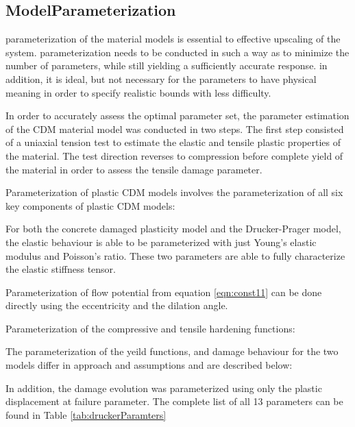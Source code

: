 \subsection{ModelParameterization}
parameterization of the material models is essential to effective upscaling of the system. parameterization needs to be conducted in such a way as to minimize the number of parameters, while still yielding a sufficiently accurate response. in addition, it is ideal, but not necessary for the parameters to have physical meaning in order to specify realistic bounds with less difficulty.

In order to accurately assess the optimal parameter set, the parameter estimation of the CDM material model was conducted in two steps. The first step consisted of a uniaxial tension test to estimate the elastic and tensile plastic properties of the material. The test direction reverses to compression before complete yield of the material in order to assess the tensile damage parameter. 

Parameterization of plastic CDM models involves the parameterization of all six key components of plastic CDM models:

For both the concrete damaged plasticity model and the Drucker-Prager model, the elastic behaviour is able to be parameterized with just Young's elastic modulus and Poisson's ratio. These two parameters are able to fully characterize the elastic stiffness tensor.

Parameterization of flow potential from equation \ref{eqn:const11} can be done directly using the eccentricity and the dilation angle.

Parameterization of the compressive and tensile hardening functions:

The parameterization of the yeild functions, and damage behaviour for the two models differ in approach and assumptions and are described below:





In addition, the damage evolution was parameterized using only the plastic displacement at failure parameter. The complete list of all 13 parameters can be found in Table \ref{tab:druckerParamters}

